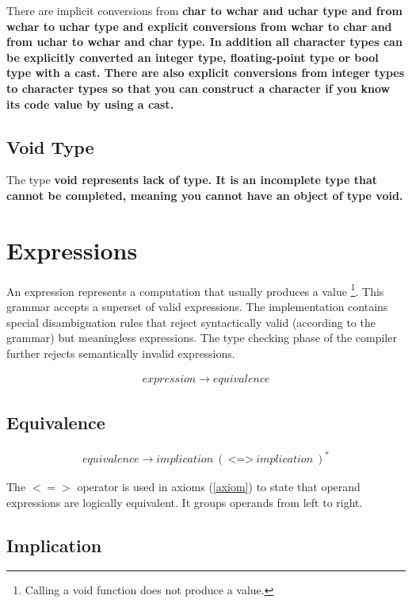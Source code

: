 \documentclass[a4paper,oneside,11pt]{article}
\begin{document}
There are implicit conversions from \bf{char} to \bf{wchar} and \bf{uchar} type and from \bf{wchar} to \bf{uchar} type and
explicit conversions from \bf{wchar} to \bf{char} and from \bf{uchar} to \bf{wchar} and \bf{char} type.
In addition all character types can be explicitly converted an integer type, floating-point type or \bf{bool} type with a \bf{cast}.
There are also explicit conversions from integer types to character types so that you can construct a character if you know
its code value by using a cast.

\subsection{Void Type}

The type \bf{void} represents lack of type. It is an incomplete type that cannot be completed, meaning you cannot have an object of type \bf{void}.

\section{Expressions}\label{expression}

An expression represents a computation that usually produces a value \footnote{Calling a void function does not produce a value.}.
This grammar accepts a superset of valid expressions. The implementation contains special disambiguation rules that reject syntactically
valid (according to the grammar) but meaningless expressions.
The type checking phase of the compiler further rejects semantically invalid expressions.

\begin{align*}
expression \rightarrow \hyperref[equivalence]{equivalence}
\end{align*}

\subsection{Equivalence}\label{equivalence}

\begin{align*}
equivalence \rightarrow \hyperref[implication]{implication} \>( \> \texttt{<=>} \> implication \> )^*
\end{align*}

The $<=>$ operator is used in axioms (\ref{axiom}) to state that operand expressions are logically equivalent.
It groups operands from left to right.

\subsection{Implication}\label{implication}
\end{document}
